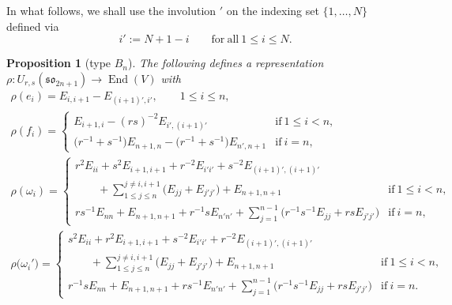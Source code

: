 \documentclass[10pt,a4paper]{amsart}
\numberwithin{equation}{section}
\newtheorem{Proposition}[Theorem]{Proposition}
 { \theoremstyle{definition}
\newtheorem{Definition}[Theorem]{Definition}
\newtheorem{Note}[Theorem]{Note}
\newtheorem{Example}[Theorem]{Example}
\newtheorem{Remark}[Theorem]{Remark} }
\DeclareMathOperator{\End}{End}
\newcommand{\sso}{\mathfrak{so}}
\begin{document}
In what follows, we shall use the involution $'$ on the indexing set $\{1, \dots, N\}$ defined via
\[
 i':= N + 1 - i \qquad \mathrm{for\ all} \ 1\leq i\leq N.
\]

\begin{Proposition}[type $B_n$]\label{prp:B_rep}
The following defines a representation $\rho\colon U_{r,s}(\sso_{2n + 1})\to \End(V)$ with
\begin{gather*}
 \rho(e_{i}) = E_{i,i + 1} - E_{(i + 1)',i'},\qquad 1\leq i\leq n , \\
 \rho(f_{i}) =
 \begin{cases}
 E_{i + 1, i} - (rs)^{-2}E_{i', (i + 1)'} & \mathrm{if}\ 1\leq i<n, \\
 \bigl(r^{-1} + s^{-1}\bigr)E_{n + 1,n} - \bigl(r^{-1} + s^{-1}\bigr)E_{n', n + 1} & \mathrm{if}\ i = n,
 \end{cases} \\
 \rho(\omega_{i}) =
 \begin{cases}
 \displaystyle r^{2}E_{ii} + s^{2}E_{i + 1, i + 1} + r^{-2}E_{i'i'} + s^{-2}E_{(i + 1)', (i + 1)'} \\
 \displaystyle \qquad{} + \sum_{1\leq j\leq n}^{j \neq i,i + 1} \bigl(E_{jj}+E_{j'j'}\bigr)
 + E_{n+1,n+1}
 & \mathrm{if}\ 1\leq i<n, \\
 \displaystyle{rs^{-1}E_{nn} + E_{n + 1,n+1} + r^{-1}sE_{n'n'} + \sum_{j = 1}^{n-1}\bigl(r^{-1}s^{-1}E_{jj} + rsE_{j'j'}\bigr)} & \mathrm{if}\ i = n,
 \end{cases} \\
 \rho\bigl(\omega_{i}'\bigr) =
 \begin{cases}
 \displaystyle s^{2}E_{ii} + r^{2}E_{i + 1, i + 1} + s^{-2}E_{i'i'} + r^{-2}E_{(i + 1)', (i + 1)'} \\
 \displaystyle\qquad{}+ \sum_{1\leq j\leq n}^{j \neq i,i + 1} \bigl(E_{jj} + E_{j'j'}\bigr)
 + E_{n+1,n+1}
 & \mathrm{if}\ 1\leq i<n ,\\
 \displaystyle{r^{-1}sE_{nn} + E_{n + 1,n+1} + rs^{-1}E_{n'n'} + \sum_{j = 1}^{n-1}\bigl(r^{-1}s^{-1}E_{jj} + rsE_{j'j'}\bigr)} & \mathrm{if}\ i = n.
\end{cases}
\end{gather*}
\end{Proposition}
\end{document}
